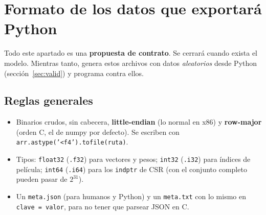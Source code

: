 \documentclass[a4paper,11pt]{article}
\newcommand{\cod}[1]{\texttt{#1}}
\begin{document}
\section{Formato de los datos que exportará Python}\label{sec:formato}

\begin{ojo}[Provisional]
Todo este apartado es una \textbf{propuesta de contrato}. Se cerrará cuando exista el modelo. Mientras tanto, genera
estos archivos con datos \emph{aleatorios} desde Python (sección~\ref{sec:valid}) y programa contra ellos.
\end{ojo}

\subsection{Reglas generales}
\begin{itemize}
  \item Binarios crudos, sin cabecera, \textbf{little-endian} (lo normal en x86) y \textbf{row-major} (orden C, el de
        numpy por defecto). Se escriben con \cod{arr.astype('<f4').tofile(ruta)}.
  \item Tipos: \cod{float32} (\cod{.f32}) para vectores y pesos; \cod{int32} (\cod{.i32}) para índices de película;
        \cod{int64} (\cod{.i64}) para los \cod{indptr} de CSR (con el conjunto completo pueden pasar de $2^{31}$).
  \item Un \cod{meta.json} (para humanos y Python) y un \cod{meta.txt} con lo mismo en \cod{clave = valor}, para no
        tener que parsear JSON en C.
\end{itemize}
\end{document}
